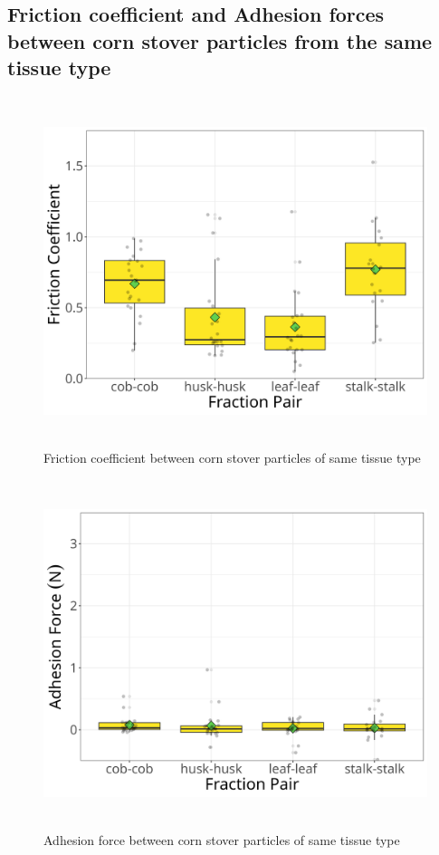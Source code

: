 \documentclass[xcolor=dvipsnames,10pt,hidelinks]{article}
\let\oldsubsection\subsection
\renewcommand{\subsection}{\clearpage\oldsubsection}
\begin{document}
\subsection{Friction coefficient and Adhesion forces between corn stover particles from the same tissue type}
\label{sec:org94bb222}
\begin{figure}[htbp]
\centering
\includegraphics[height=4in]{./figures/cs_cs_same_fraction_coeff_mu_box_plt.png}
\caption{\label{fig:orgb45098f}Friction coefficient between corn stover particles of same tissue type}
\end{figure}

\newpage

\begin{figure}[htbp]
\centering
\includegraphics[height=4in]{./figures/cs_cs_same_fraction_coeff_c_box_plt.png}
\caption{\label{fig:org3e3a4a9}Adhesion force between corn stover particles of same tissue type}
\end{figure}
\end{document}
